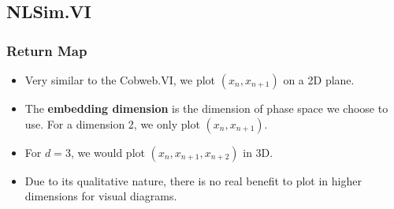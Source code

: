 \documentclass[9pt]{beamer}
\begin{document}
\subsection{NLSim.VI}

\begin{frame}
	\frametitle{Return Map}
	\begin{itemize}
		\item Very similar to the Cobweb.VI, we plot \( (x_n, x_{n + 1}) \) on a 2D
			plane.   
		\item The \textbf{embedding dimension} is the dimension of phase space we choose to
			use. For a dimension 2, we only plot \( (x_n, x_{n + 1}) \). 
		\item For \( d =3 \), we would plot \( (x_n, x_{n + 1}, x_{n + 2}) \) in 3D. 
		\item Due to its qualitative nature, there is no real benefit to plot in
			higher dimensions for visual diagrams.   
	\end{itemize}
\end{frame}
\end{document}
